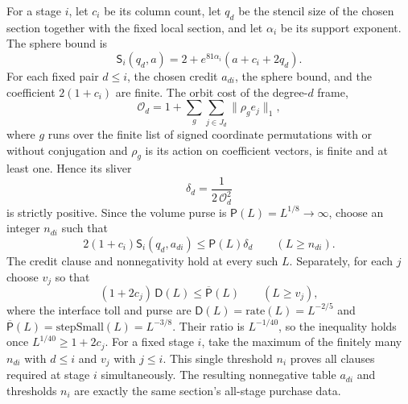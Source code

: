 For a stage $i$, let $c_i$ be its column count, let $q_d$ be the stencil
size of the chosen section together with the fixed local section, and let
$\alpha_i$ be its support exponent. The sphere bound is
\[
 \mathsf S_i(q_d,a)=2+e^{81\alpha_i}(a+c_i+2q_d).
\]
For each fixed pair $d\leq i$, the chosen credit $a_{di}$, the sphere bound,
and the coefficient $2(1+c_i)$ are finite. The orbit cost of the
degree-$d$ frame,
\[
 \mathcal O_d=1+\sum_{g}\sum_{j\in J_d}\|\rho_ge_j\|_1,
\]
where $g$ runs over the finite list of signed coordinate permutations
with or without conjugation and $\rho_g$ is its action on coefficient
vectors, is finite and at least one. Hence its sliver
\[
       \delta_d=\frac{1}{2\,\mathcal O_d^2}
\]
is strictly positive. Since the volume purse is
$\mathsf P(L)=L^{1/8}\to\infty$, choose an integer $n_{di}$ such that
\[
 2(1+c_i)\mathsf S_i(q_d,a_{di})
       \leq \mathsf P(L)\delta_d\qquad(L\geq n_{di}).
\]
The credit clause and nonnegativity hold at every such $L$. Separately,
for each $j$ choose $v_j$ so that
\[
       (1+2c_j)\,\mathsf D(L)\leq\overline{\mathsf P}(L)
                  \qquad(L\geq v_j),
\]
where the interface toll and purse are
$\mathsf D(L)=\mathrm{rate}(L)=L^{-2/5}$ and
$\overline{\mathsf P}(L)=\mathrm{stepSmall}(L)=L^{-3/8}$. Their ratio is
$L^{-1/40}$, so the inequality holds once $L^{1/40}\geq1+2c_j$. For a fixed stage $i$, take
the maximum of the finitely many $n_{di}$ with $d\leq i$ and $v_j$ with
$j\leq i$. This single threshold $n_i$ proves all clauses required at
stage $i$ simultaneously. The resulting nonnegative table $a_{di}$ and
thresholds $n_i$ are exactly the same section's all-stage purchase data.

